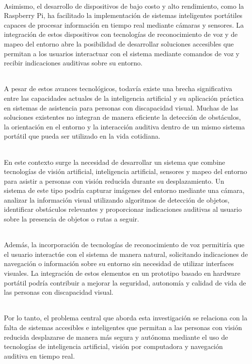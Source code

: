 \\

Asimismo, el desarrollo de dispositivos de bajo costo y alto rendimiento, como la Raspberry Pi, ha facilitado la implementación de sistemas inteligentes portátiles capaces de procesar información en tiempo real mediante cámaras y sensores. La integración de estos dispositivos con tecnologías de reconocimiento de voz y de mapeo del entorno abre la posibilidad de desarrollar soluciones accesibles que permitan a los usuarios interactuar con el sistema mediante comandos de voz y recibir indicaciones auditivas sobre su entorno.

\\

A pesar de estos avances tecnológicos, todavía existe una brecha significativa entre las capacidades actuales de la inteligencia artificial y su aplicación práctica en sistemas de asistencia para personas con discapacidad visual. Muchas de las soluciones existentes no integran de manera eficiente la detección de obstáculos, la orientación en el entorno y la interacción auditiva dentro de un mismo sistema portátil que pueda ser utilizado en la vida cotidiana.

\\

En este contexto surge la necesidad de desarrollar un sistema que combine tecnologías de visión artificial, inteligencia artificial, sensores y mapeo del entorno para asistir a personas con visión reducida durante su desplazamiento. Un sistema de este tipo podría capturar imágenes del entorno mediante una cámara, analizar la información visual utilizando algoritmos de detección de objetos, identificar obstáculos relevantes y proporcionar indicaciones auditivas al usuario sobre la presencia de objetos o rutas a seguir.

\\

Además, la incorporación de tecnologías de reconocimiento de voz permitiría que el usuario interactúe con el sistema de manera natural, solicitando indicaciones de navegación o información sobre su entorno sin necesidad de utilizar interfaces visuales. La integración de estos elementos en un prototipo basado en hardware portátil podría contribuir a mejorar la seguridad, autonomía y calidad de vida de las personas con discapacidad visual.

\\

Por lo tanto, el problema central que aborda esta investigación se relaciona con la falta de sistemas accesibles e inteligentes que permitan a las personas con visión reducida desplazarse de manera más segura y autónoma mediante el uso de tecnologías de inteligencia artificial, visión por computadora y navegación auditiva en tiempo real.

